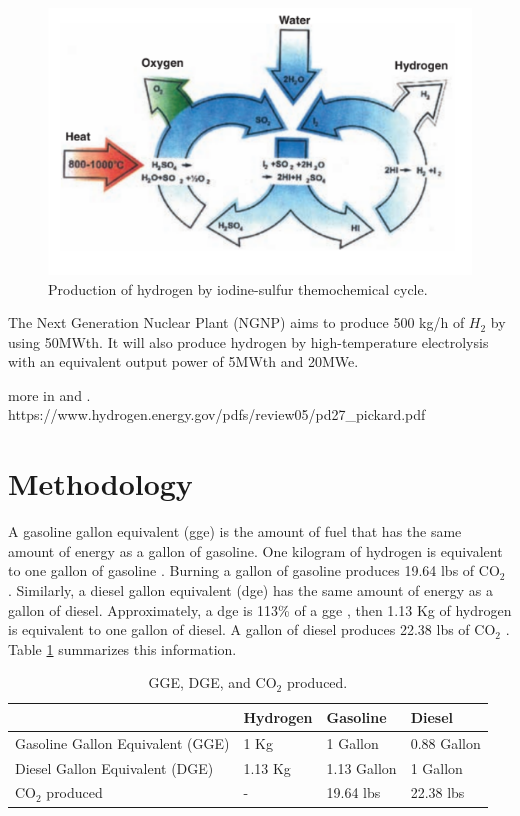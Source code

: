 \documentclass{anstrans}
\begin{document}
\begin{figure}[H]
	\centering
	\includegraphics[width=0.4\linewidth]{figures/iodine-sulfur.png}
	\hfill
	\caption{Production of hydrogen by iodine-sulfur themochemical cycle.}
	\label{fig:isulfur}
\end{figure}



The Next Generation Nuclear Plant (NGNP) \cite{macdonald_ngnp_2003} aims to produce 500 kg/h of $H_2$ by using 50MWth. It will also produce hydrogen by high-temperature electrolysis with an equivalent output power of 5MWth and 20MWe.

more in \cite{brown_high_2003} and \cite{terada_development_2007}.
https://www.hydrogen.energy.gov/pdfs/review05/pd27_pickard.pdf

\section{Methodology}
\label{method}

A gasoline gallon equivalent (gge) is the amount of fuel that has the same amount of energy as a gallon of gasoline. One kilogram of hydrogen is equivalent to one gallon of gasoline \cite{noauthor_hydrogen_nodate}. Burning a gallon of gasoline produces 19.64 lbs of CO$_2$ \cite{noauthor_how_2014}. 
Similarly, a diesel gallon equivalent (dge) has the same amount of energy as a gallon of diesel. Approximately, a dge is 113\% of a gge \cite{noauthor_fuel_2014}, then 1.13 Kg of hydrogen is equivalent to one gallon of diesel.
A gallon of diesel produces 22.38 lbs of CO$_2$ \cite{noauthor_how_2014}. 
Table \ref{tab:meth} summarizes this information.

\begin{table}[]
	\centering
    \caption{GGE, DGE, and CO$_2$ produced.}
    \label{tab:meth}
	\begin{tabular}{l|l|l|l}
	\hline
	                                 & Hydrogen & Gasoline    & Diesel      \\ \hline
	Gasoline Gallon Equivalent (GGE) & 1 Kg     & 1 Gallon    & 0.88 Gallon \\
	Diesel Gallon Equivalent (DGE)   & 1.13 Kg  & 1.13 Gallon & 1 Gallon    \\
    CO$_2$ produced                  & -        & 19.64 lbs   & 22.38 lbs   \\ \hline

	\end{tabular}
\end{table}
\end{document}
